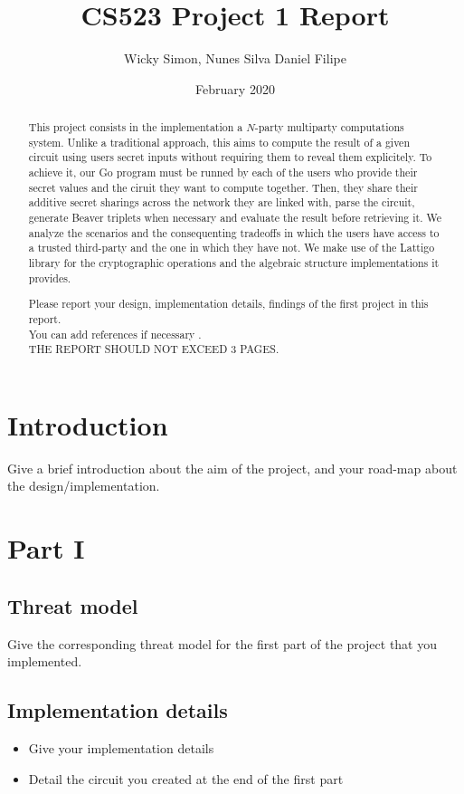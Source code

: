 \documentclass[10pt,conference,compsocconf]{IEEEtran}
\title{CS523 Project 1 Report}
\author{Wicky Simon, Nunes Silva Daniel Filipe}
\date{February 2020}
\begin{document}
\maketitle

\begin{abstract}
This project consists in the implementation a $N$-party multiparty
computations system. Unlike a traditional approach, this aims to compute
the result of a given circuit using users secret inputs without requiring
them to reveal them explicitely. To achieve it, our Go program must be runned
by each of the users who provide their secret values and the ciruit they
want to compute together. Then, they share their additive secret sharings
across the network they are linked with, parse the circuit, generate Beaver
triplets when necessary and evaluate the result before retrieving it.
We analyze the scenarios and the consequenting tradeoffs in which the users
have access to a trusted third-party and the one in which they have not. We
make use of the Lattigo library for the cryptographic operations and the
algebraic structure implementations it provides.

Please report your design, implementation details, findings of the first project in this report. \\
You can add references if necessary \cite{article}. \\
THE REPORT SHOULD NOT EXCEED 3 PAGES.
\end{abstract}
\section{Introduction}
Give a brief introduction about the aim of the project, and your road-map about the design/implementation.
\section{Part I}

\subsection{Threat model}
Give the corresponding threat model for the first part of the project that you implemented. 
\subsection{Implementation details}
\begin{itemize}
    \item Give your implementation details
    \item Detail the circuit you created at the end of the first part
\end{itemize}
\end{document}
